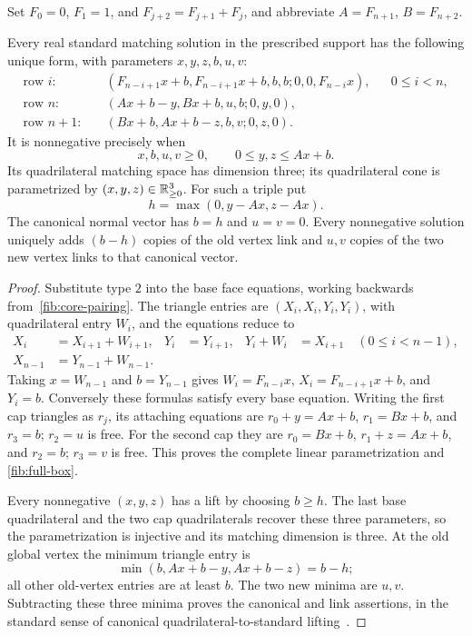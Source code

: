 Set \(F_0=0\), \(F_1=1\), and \(F_{j+2}=F_{j+1}+F_j\), and abbreviate
\(A=F_{n+1}\), \(B=F_{n+2}\).

\begin{theorem}
\label{fib:coordinates}
Every real standard matching solution in the prescribed support has the
following unique form, with parameters \(x,y,z,b,u,v\):
\begin{align}
 \text{row }i:\quad&
 (F_{n-i+1}x+b,F_{n-i+1}x+b,b,b;0,0,F_{n-i}x),
 &&0\leq i<n,\label{fib:base-row}\\
 \text{row }n:\quad&
 (Ax+b-y,Bx+b,u,b;0,y,0),\label{fib:first-cap}\\
 \text{row }n+1:\quad&
 (Bx+b,Ax+b-z,b,v;0,z,0).\label{fib:second-cap}
\end{align}
It is nonnegative precisely when
\begin{equation}
 x,b,u,v\geq0,\qquad 0\leq y,z\leq Ax+b.
 \label{fib:full-box}
\end{equation}
Its quadrilateral matching space has dimension three; its quadrilateral
cone is parametrized by \((x,y,z)\in\mathbb{R}_{\geq0}^3\).
For such a triple put
\begin{equation}
 h=\max(0,y-Ax,z-Ax).
 \label{fib:hinge}
\end{equation}
The canonical normal vector has \(b=h\) and \(u=v=0\).
Every nonnegative solution uniquely adds \((b-h)\) copies of the old
vertex link and \(u,v\) copies of the two new vertex links to that
canonical vector.
\end{theorem}
\begin{proof}
Substitute type \(2\) into the base face equations, working backwards
from~\eqref{fib:core-pairing}.  The triangle entries are
\((X_i,X_i,Y_i,Y_i)\), with quadrilateral entry \(W_i\), and the
equations reduce to
\begin{align*}
 X_i&=X_{i+1}+W_{i+1},&Y_i&=Y_{i+1},&
 Y_i+W_i&=X_{i+1}\quad(0\leq i<n-1),\\
 X_{n-1}&=Y_{n-1}+W_{n-1}.
\end{align*}
Taking \(x=W_{n-1}\) and \(b=Y_{n-1}\) gives
\(W_i=F_{n-i}x\), \(X_i=F_{n-i+1}x+b\), and \(Y_i=b\).
Conversely these formulas satisfy every base equation.
Writing the first cap triangles as \(r_j\), its attaching equations are
\(r_0+y=Ax+b\), \(r_1=Bx+b\), and \(r_3=b\); \(r_2=u\)
is free.  For the second cap they are
\(r_0=Bx+b\), \(r_1+z=Ax+b\), and \(r_2=b\); \(r_3=v\)
is free.  This proves the complete linear parametrization and
\eqref{fib:full-box}.

Every nonnegative \((x,y,z)\) has a lift by choosing \(b\geq h\).
The last base quadrilateral and the two cap quadrilaterals recover these
three parameters, so the parametrization is injective and its matching
dimension is three.  At the old global vertex the minimum triangle entry
is
\[
 \min(b,Ax+b-y,Ax+b-z)=b-h;
\]
all other old-vertex entries are at least \(b\).  The two new minima
are \(u,v\).  Subtracting these three minima proves the canonical and
link assertions, in the standard sense of canonical
quadrilateral-to-standard lifting~\cite{Burton2009}.
\end{proof}

